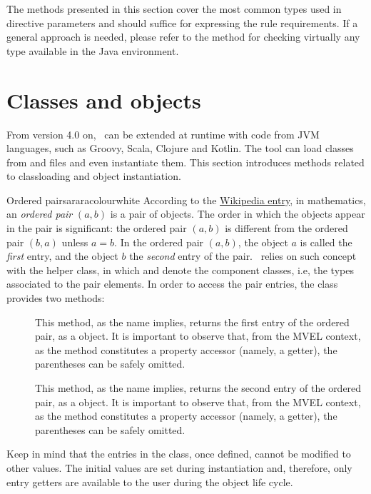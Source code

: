 The methods presented in this section cover the most common types used in directive parameters and should suffice for expressing the rule requirements. If a general approach is needed, please refer to the  method for checking virtually any type available in the Java environment.

\section{Classes and objects}
\label{sec:classesandobjects}

From version 4.0 on, \arara\ can be extended at runtime with code from JVM languages, such as Groovy, Scala, Clojure and Kotlin. The tool can load classes from  and  files and even instantiate them. This section introduces methods related to classloading and object instantiation.

\begin{messagebox}{Ordered pairs}{araracolour}{\icok}{white}
According to the \href{https://en.wikipedia.org/wiki/Ordered_pair}{Wikipedia entry}, in mathematics, an \emph{ordered pair} $(a, b)$ is a pair of objects. The order in which the objects appear in the pair is significant: the ordered pair $(a, b)$ is different from the ordered pair $(b, a)$ unless $a = b$. In the ordered pair $(a, b)$, the object $a$ is called the \emph{first} entry, and the object $b$ the \emph{second} entry of the pair. \arara\ relies on such concept with the helper  class, in which  and  denote the component classes, i.e, the types associated to the pair elements. In order to access the pair entries, the class provides two methods:

\begin{description}
\item[\hfill{}] This method, as the name implies, returns the first entry of the ordered pair, as a  object. It is important to observe that, from the MVEL context, as the method constitutes a property accessor (namely, a getter), the parentheses can be safely omitted.

\item[\hfill{}] This method, as the name implies, returns the second entry of the ordered pair, as a  object. It is important to observe that, from the MVEL context, as the method constitutes a property accessor (namely, a getter), the parentheses can be safely omitted.
\end{description}

Keep in mind that the entries in the  class, once defined, cannot be modified to other values. The initial values are set during instantiation and, therefore, only entry getters are available to the user during the object life cycle. 
\end{messagebox}

